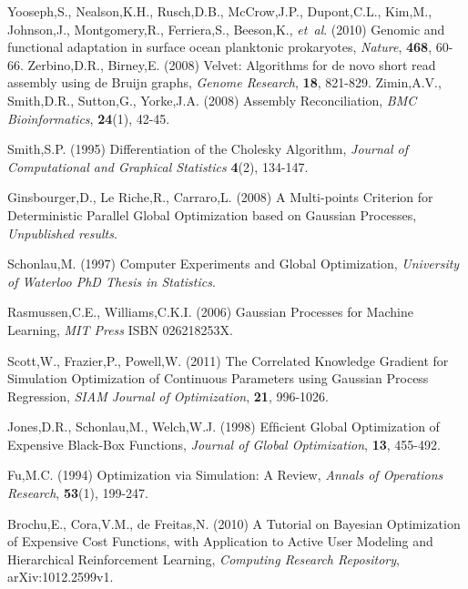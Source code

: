\documentclass[phd,tocprelim]{cornell}
\begin{document}
\begin{thebibliography}{}
 Yooseph,S., Nealson,K.H., Rusch,D.B., McCrow,J.P., Dupont,C.L., Kim,M., Johnson,J., Montgomery,R., Ferriera,S., Beeson,K., {\it et~al}. (2010) Genomic and functional adaptation in surface ocean planktonic prokaryotes, {\it Nature}, {\bf 468}, 60-66.
 Zerbino,D.R., Birney,E. (2008) Velvet: Algorithms for de novo short read assembly using de Bruijn graphs, {\it Genome Research}, {\bf 18}, 821-829.
 Zimin,A.V., Smith,D.R., Sutton,G., Yorke,J.A. (2008) Assembly Reconciliation, {\it BMC Bioinformatics}, {\bf 24}(1), 42-45.


 Smith,S.P. (1995) Differentiation of the Cholesky Algorithm, {\it Journal of Computational and Graphical Statistics} {\bf 4}(2), 134-147.

 Ginsbourger,D., Le Riche,R., Carraro,L. (2008) A Multi-points Criterion for Deterministic Parallel Global Optimization based on Gaussian Processes, {\it Unpublished results}.

 Schonlau,M. (1997) Computer Experiments and Global Optimization, {\it University of Waterloo PhD Thesis in Statistics}.

 Rasmussen,C.E., Williams,C.K.I. (2006) Gaussian Processes for Machine Learning, {\it MIT Press} ISBN 026218253X.

 Scott,W., Frazier,P., Powell,W. (2011) The Correlated Knowledge Gradient for Simulation Optimization of Continuous Parameters using Gaussian Process Regression, {\it SIAM Journal of Optimization}, {\bf 21}, 996-1026.

 Jones,D.R., Schonlau,M., Welch,W.J. (1998) Efﬁcient Global Optimization of Expensive
Black-Box Functions, {\it Journal of Global Optimization}, {\bf 13}, 455-492.

 Fu,M.C. (1994) Optimization via Simulation: A Review, {\it Annals of Operations Research}, {\bf 53}(1), 199-247.

 Brochu,E., Cora,V.M., de Freitas,N. (2010) A Tutorial on Bayesian Optimization of Expensive Cost Functions, with Application to Active User Modeling and Hierarchical Reinforcement Learning, {\it Computing Research Repository}, arXiv:1012.2599v1.


\end{thebibliography}
\end{document}
